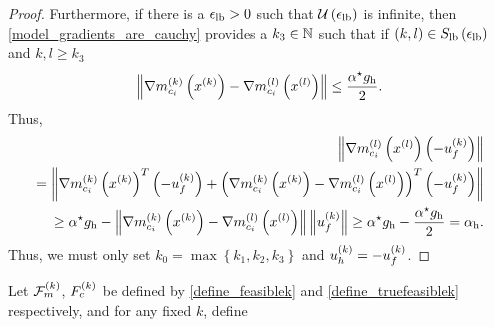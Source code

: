 \begin{proof}
Furthermore, if there is a ${\epsilon_{\textrm{lb}}} > 0$ such that ${\mathcal U\left(\epsilon_{\textrm{lb}}\right)}$ is infinite,
then \cref{model_gradients_are_cauchy} provides a $k_3 \in \mathbb N$ such that if $(k, l) \in {S_{\textrm{lb}}\left(\epsilon_{\textrm{lb}}\right)}$ and $k, l \ge k_3$
\begin{align*}
\left\|{\nabla m_{c_i}^{(k)}\left(x^{(k)}\right)} - {\nabla m_{c_i}^{(l)}\left({x^{(l)}}\right)}\right\| \le \frac {{ \alpha^{\star} } { g_{\textrm{h}} }} {2}.
\end{align*}
Thus,
\begin{align*}
\left\|{\nabla m_{c_i}^{(l)}\left({x^{(l)}}\right)} \left(-{u^{(k)}_f}\right) \right\| \\
= \left\|{\nabla m_{c_i}^{(k)}\left(x^{(k)}\right)}^T\left(-{u^{(k)}_f}\right) + \left({\nabla m_{c_i}^{(k)}\left(x^{(k)}\right)} - {\nabla m_{c_i}^{(l)}\left({x^{(l)}}\right)} \right)^T\left(-{u^{(k)}_f}\right)\right\| \\
\ge { \alpha^{\star} } { g_{\textrm{h}} } - \left\|{\nabla m_{c_i}^{(k)}\left(x^{(k)}\right)} - {\nabla m_{c_i}^{(l)}\left({x^{(l)}}\right)} \right\|\left\|{u^{(k)}_f}\right\|
\ge { \alpha^{\star} } { g_{\textrm{h}} } - \frac {{ \alpha^{\star} } { g_{\textrm{h}} }} {2} = { \alpha_{\textrm{h}} }.
\end{align*}
Thus, we must only set $k_0 = \max \left\{k_1, k_2, k_3\right\}$ and ${ u_{h}^{(k)} }=-{u^{(k)}_f}$.
\end{proof}




% 
% 
% 
% 
% 
% 
% 







Let ${\mathcal F_m^{(k)}}$, ${F_c^{(k)}}$ be defined by \cref{define_feasiblek} and \cref{define_truefeasiblek} respectively, 
and for any fixed $k$, define

